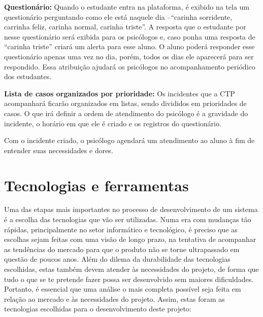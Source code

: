\documentclass[12pt,a4paper]{article}
\begin{document}
\textbf{Questionário:} Quando o estudante entra na plataforma, é exibido na tela um questionário perguntando como ele está naquele dia –“carinha sorridente, carrinha feliz, carinha normal, carinha triste”. A resposta que o estudante por nesse questionário será exibida para os psicólogos e, caso ponha uma resposta de “carinha triste” criará um alerta para esse aluno. O aluno poderá responder esse questionário apenas uma vez no dia, porém, todos os dias ele aparecerá para ser respondido. Essa atribuição ajudará os psicólogos no acompanhamento periódico dos estudantes.

\textbf{Lista de casos organizados por prioridade:} Os incidentes que a CTP acompanhará ficarão organizados em listas, sendo divididos em prioridades de casos. O que irá definir a ordem de atendimento do psicólogo é a gravidade do incidente, o horário em que ele é criado e os registros do questionário.

Com o incidente criado, o psicólogo agendará um atendimento ao aluno à fim de entender suas necessidades e dores.

\section{Tecnologias e ferramentas}

Uma das etapas mais importantes no processo de desenvolvimento de um sistema é a escolha das tecnologias que vão ser utilizadas. Numa era com mudanças tão rápidas, principalmente no setor informático e tecnológico, é preciso que as escolhas sejam feitas com uma visão de longo prazo, na tentativa de acompanhar as tendências do mercado para que o produto não se torne ultrapassado em questão de poucos anos. Além do dilema da durabilidade das tecnologias escolhidas, estas também devem atender às necessidades do projeto, de forma que tudo o que se te pretende fazer possa ser desenvolvido sem maiores dificuldades. Portanto, é essencial que uma análise o mais completa possível seja feita em relação ao mercado e às necessidades do projeto. Assim, estas foram as tecnologias escolhidas para o desenvolvimento deste projeto:
\end{document}
